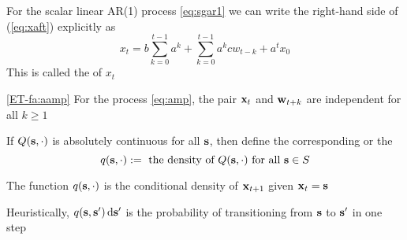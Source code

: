 \begin{frame}

    \vspace{2em}
    \Eg
    \label{eg:sar1}
    For the scalar linear AR(1) process \eqref{eq:sgar1}
    we can write the right-hand side of (\ref{eq:xaft}) explicitly as 
    \begin{equation}
        \label{eq:ar1ft}
        x_t = b \sum_{k=0}^{t-1} a^k 
            + \sum_{k=0}^{t-1} a^k c w_{t-k} + a^t x_0
    \end{equation}
    This is called the  of $x_t$
    
\end{frame}

\begin{frame}

    \Fact\textcolor{Brown}{\eqref{ET-fa:aamp}}
    For the process \eqref{eq:amp}, the pair ${\mathbf x}_t$ and 
    ${\mathbf w}_{t+k}$ are independent for all $k \geq 1$ 
    
\end{frame}


\begin{frame}

    \vspace{2em}
    If $Q({\mathbf s}, \cdot)$ is absolutely continuous for all ${\mathbf s}$, 
    then define the corresponding  or the  
    \begin{equation*}
        \label{eq:td}
        q({\mathbf s}, \cdot) := \text{ the density of } Q({\mathbf s}, \cdot)
        \text{ for all } {\mathbf s} \in S
    \end{equation*}
    
    \vspace{1em}
    The function $q({\mathbf s}, \cdot)$ is the conditional density of
    ${\mathbf x}_{t+1}$ given ${\mathbf x}_t = {\mathbf s}$
    
    Heuristically, $q({\mathbf s}, {\mathbf s}') \mathop{}\!\mathrm{d} {\mathbf s}'$ is the
    probability of transitioning from ${\mathbf s}$ to ${\mathbf s}'$ in one step
    
\end{frame}


